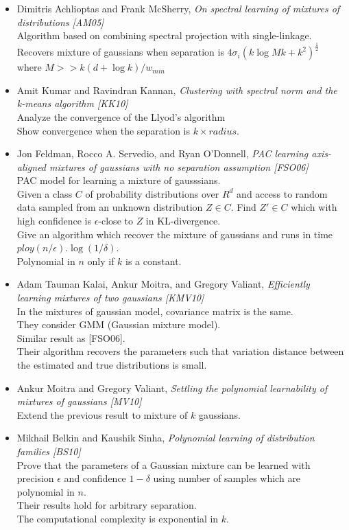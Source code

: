 \documentclass[12pt]{article}
\begin{document}
\begin{itemize}
	\item Dimitris Achlioptas and Frank McSherry, {\em On spectral learning of mixtures of distributions [AM05]}\\
	Algorithm based on combining spectral projection with single-linkage.\\
	Recovers mixture of gaussians when separation is $4\sigma_i(k\log Mk + k^2)^{\frac{1}{2}}$ where $M >> k(d+ \log k)/w_{min}$
	
	\item Amit Kumar and Ravindran Kannan, {\em Clustering with spectral norm and the k-means algorithm [KK10]}\\
	Analyze the convergence of the Llyod's algorithm\\
	Show convergence when the separation is $k \times radius$. 
	\item Jon Feldman, Rocco A. Servedio, and Ryan O’Donnell, {\em PAC learning axis-aligned mixtures of gaussians with no separation assumption [FSO06]}\\
	PAC model for learning a mixture of gausssians.\\
	Given a class $C$ of probability distributions over $R^d$ and access to random data sampled from an unknown distribution $Z \in C$. Find $Z' \in C$ which with high confidence is $\epsilon$-close to $Z$ in KL-divergence.\\
	Give an algorithm which recover the mixture of gaussians and runs in time $ploy(n/\epsilon).\log(1/\delta)$.\\
	Polynomial in $n$ only if $k$ is a constant. 
	
	\item Adam Tauman Kalai, Ankur Moitra, and Gregory Valiant, {\em Efficiently learning mixtures of two gaussians [KMV10]}\\
	In the mixtures of gaussian model, covariance matrix is the same.\\
	They consider GMM (Gaussian mixture model).\\
	Similar result as [FSO06].\\
	Their algorithm recovers the parameters such that variation distance between the estimated and true distributions is small.
	
	\item Ankur Moitra and Gregory Valiant, {\em Settling the polynomial learnability of mixtures of gaussians [MV10]}\\
	Extend the previous result to mixture of $k$ gaussians.
	
	\item Mikhail Belkin and Kaushik Sinha, {\em Polynomial learning of distribution families [BS10]}\\
	Prove that the parameters of a Gaussian mixture can be learned with precision $\epsilon$ and confidence $1−\delta$ using number of samples which are polynomial in $n$.\\
	Their results hold for arbitrary separation.\\
	The computational complexity is exponential in $k$.
	

\end{itemize}
\end{document}
